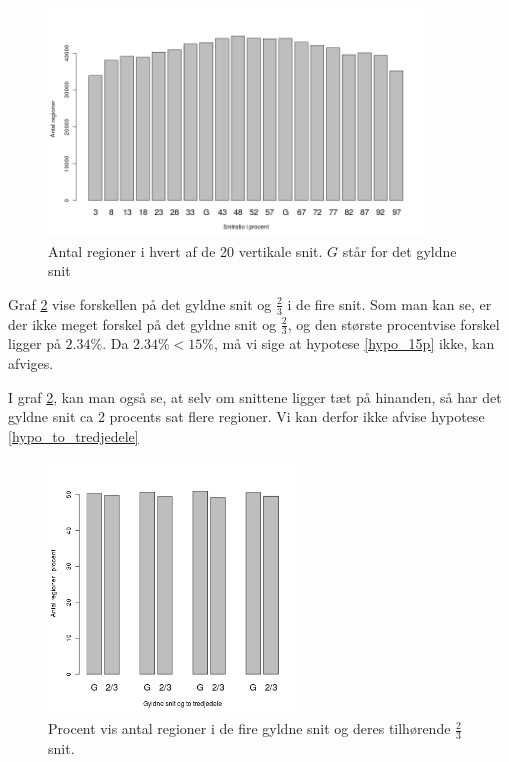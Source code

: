 \begin{figure}[h!]
	\begin{center}
		\includegraphics[width=0.9\textwidth]{afsnit/resultater/billeder/cut0cut1eatsperratio.png}
	\end{center}
	\caption{Antal regioner i hvert af de 20 vertikale snit. $G$ står for det gyldne snit}
	\label{antal_regioner_vertikale_cut}
\end{figure}

Graf \ref{G_vs_to_trejedele} vise forskellen på det gyldne snit og
$\frac{2}{3}$ i de fire snit. Som man kan se, er der ikke meget forskel
på det gyldne snit og $\frac{2}{3}$, og den største procentvise forskel
ligger på $2.34\%$. Da $2.34 \% < 15\%$, må vi sige at hypotese
\ref{hypo_15p} ikke, kan afviges.

I graf \ref{G_vs_to_trejedele}, kan man også se, at selv om snittene
ligger tæt på hinanden, så har det gyldne snit ca 2 procents sat
flere regioner. Vi kan derfor ikke afvise hypotese
\ref{hypo_to_tredjedele}

\begin{figure}[h!]
	\begin{center}
		\includegraphics[width=0.6\textwidth]{afsnit/resultater/billeder/G_vs_to_tredjedele.png}
	\end{center}
	\caption{Procent vis antal regioner i de fire gyldne snit og deres tilhørende $\frac{2}{3}$ snit.}
	\label{G_vs_to_trejedele}
\end{figure}

